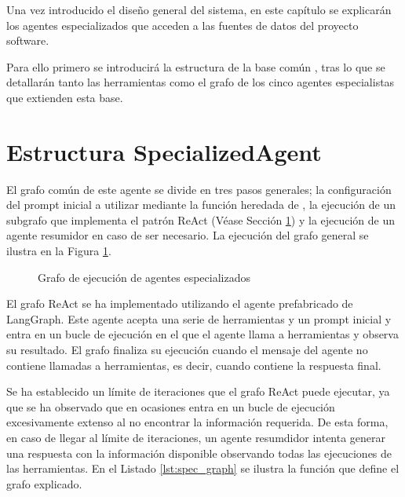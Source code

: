 Una vez introducido el diseño general del sistema, en este capítulo se explicarán los agentes especializados que acceden a las fuentes de datos del proyecto software. 

Para ello primero se introducirá la estructura de la base común , tras lo que se detallarán tanto las herramientas como el grafo de los cinco agentes especialistas que extienden esta base.

\section{Estructura SpecializedAgent}
El grafo común de este agente se divide en tres pasos generales; la configuración del prompt inicial a utilizar mediante la función  heredada de , la ejecución de un subgrafo que implementa el patrón ReAct (Véase Sección \ref{}) y la ejecución de un agente resumidor en caso de ser necesario. La ejecución del grafo general se ilustra en la Figura \ref{fig:specialized}.

\begin{figure}[h]
  \centering
  \caption{Grafo de ejecución de agentes especializados}
  \label{fig:specialized}
\end{figure}

El grafo ReAct se ha implementado utilizando el agente prefabricado  de LangGraph. Este agente acepta una serie de herramientas y un prompt inicial y entra en un bucle de ejecución en el que el agente llama a herramientas y observa su resultado. El grafo finaliza su ejecución cuando el mensaje del agente no contiene llamadas a herramientas, es decir, cuando contiene la respuesta final. 

Se ha establecido un límite de iteraciones que el grafo ReAct puede ejecutar, ya que se ha observado que en ocasiones entra en un bucle de ejecución excesivamente extenso al no encontrar la información requerida. De esta forma, en caso de llegar al límite de iteraciones, un agente resumdidor intenta generar una respuesta con la información disponible observando todas las ejecuciones de las herramientas. En el Listado \ref{lst:spec_graph} se ilustra la función que define el grafo explicado.

